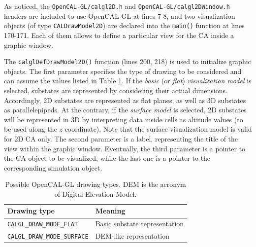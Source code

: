 

As noticed, the \verb'OpenCAL-GL/calgl2D.h' and
\verb'OpenCAL-GL/calgl2DWindow.h' headers are included to use
OpenCAL-GL at lines 7-8, and two visualization objects (of type
\verb'CALDrawModel2D') are declared into the \verb'main()' function
at lines 170-171. Each of them allows to define a particular view for
the CA inside a graphic window.

The \verb'calglDefDrawModel2D()' function (lines 200, 218) is used to
initialize graphic objects. The first parameter specifies the type of
drawing to be considered and can assume the values listed in Table
\ref{tab:draw_modes}. If the \emph{basic} (or \emph{flat})
\emph{visualization model} is selected, substates are represented by
considering their actual dimensions. Accordingly, 2D substates are
represented as flat planes, as well as 3D substates as
parallelepipeds. At the contrary, if the \emph{surface model} is
selected, 2D substates will be represented in 3D by interpreting data
inside cells as altitude values (to be used along the $z$
coordinate). Note that the surface visualization model is valid for 2D
CA only. The second parameter is a label, representing the title of the
view within the graphic window. Eventually, the third parameter is a
pointer to the CA object to be visualized, while the last one is a
pointer to the corresponding simulation object.

\begin{table}
  \centering
  \footnotesize
  \begin{tabular}{l|l}
    \hline
    Drawing type & Meaning \\
    \hline
    \hline
    \verb'CALGL_DRAW_MODE_FLAT'    & Basic substate representation \\
    \verb'CALGL_DRAW_MODE_SURFACE' & DEM-like representation \\
    \hline
  \end{tabular}
  \caption{Possible OpenCAL-GL drawing types. DEM is the acronym of Digital Elevation Model.}
  \label{tab:draw_modes}
\end{table}

